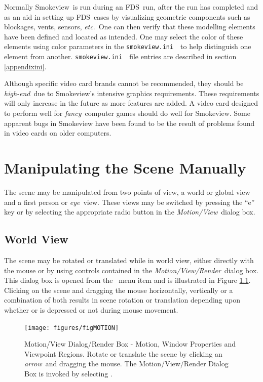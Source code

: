 \documentclass[11pt,twoside]{book}
\newcommand{\svini}{{\tt smokeview.ini}\ }
\newcommand{\figoptions}{hbp}
\newcommand{\fds}{{FDS}}
\newcommand{\smokeview}{{Smokeview}}
\newcommand{\etc}{{\em etc}}
\newcommand{\frameit}[1]{\fbox{\tt #1}}
\begin{document}
Normally \smokeview\ is run during an \fds\ run, after the
run has completed and as an aid in setting up \fds\ cases
by visualizing geometric components such as blockages,
vents, sensors, \etc.\ One can then verify that these
modelling elements have been defined and located as
intended. One may select the color of these elements using
color parameters in the \svini\ to help
distinguish one element from another. \svini\ file
entries are described in section \ref{appendixini}.

Although specific video card brands cannot be recommended, they
should be {\em high-end}\ due to Smokeview's intensive graphics
requirements. These requirements will only increase in the future
as more features are added.  A video card designed to perform well
for {\em fancy}\ computer games should do well for Smokeview. Some
apparent bugs in Smokeview have been found to be the result of
problems found in video cards on older computers.


\chapter{Manipulating the Scene Manually}
The scene may be manipulated from two points of view, a world or
global view and a first person or {\em eye}\ view.  These views may
be switched by pressing the ``e'' key or by selecting the
appropriate radio button in the {\em Motion/View}\ dialog box.

\section{World View}

The scene may be rotated or translated while in world view, either
directly with the mouse or by using controls contained in the
{\em Motion/View/Render}\ dialog box. This dialog box is opened from the
\ menu item and is illustrated in
Figure \ref{figMOTION}. Clicking on the scene and dragging the
mouse horizontally, vertically or a combination of both results in
scene rotation or translation depending upon whether
\frameit{CTRL} or \frameit{ALT} is depressed or not during mouse
movement.

\begin{figure}[\figoptions]
\centerline{
\texttt{[image: figures/figMOTION]}
}
\caption[Motion/View/Render Dialog Box - Motion, Window Properties and Viewpoint Regions.]{Motion/View Dialog/Render Box - Motion, Window Properties and Viewpoint Regions. Rotate or translate
the scene by clicking an {\em arrow}\ and dragging the mouse. The
Motion/View/Render Dialog Box is invoked by selecting
\frameit{Dialogs$>$Motion/View/Render}. }
\label{figMOTION}
\end{figure}
\end{document}
